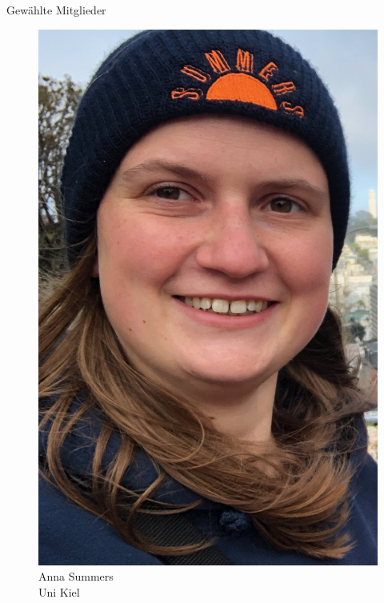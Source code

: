 \documentclass[compress, aspectratio=169]{beamer}
\begin{document}
\begin{frame}{Gewählte Mitglieder}
  \vspace{1cm}
  \hspace{0.1\textwidth}
   \begin{minipage}{.28\textwidth}
    \begin{figure}
      \begin{minipage}[c]{.57\textwidth}
        \includegraphics[height=0.35\textheight]{anna.jpeg}
      \end{minipage} \hfill
      \begin{minipage}[c]{.4\textwidth}
        \caption*{Anna Summers \\Uni Kiel}
      \end{minipage}
    \end{figure}

\end{minipage}
\end{frame}
\end{document}
